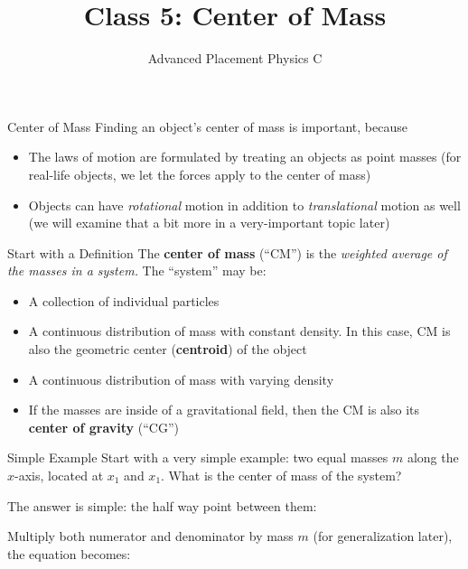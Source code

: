 \documentclass[12pt,compress,aspectratio=169]{beamer}
\title{Class 5: Center of Mass}
\subtitle{Advanced Placement Physics C}
\begin{document}
\begin{frame}
  \maketitle
\end{frame}



\begin{frame}{Center of Mass}
  Finding an object's center of mass is important, because
  \begin{itemize}
  \item The laws of motion are formulated by treating an objects as point
    masses (for real-life objects, we let the forces apply to the center of
    mass)
  \item Objects can have \emph{rotational} motion in addition to
    \emph{translational} motion as well (we will examine that a bit more in a
    very-important topic later)
  \end{itemize}
\end{frame}



\begin{frame}{Start with a Definition}
  The \textbf{center of mass} (``CM'') is the \emph{weighted average of the
  masses in a system.} The ``system'' may be:
  \begin{itemize}
  \item A collection of individual particles
  \item A continuous distribution of mass with constant density. In this case,
    CM is also the geometric center (\textbf{centroid}) of the object
  \item A continuous distribution of mass with varying density
  \item If the masses are inside of a gravitational field, then the CM is also
    its \textbf{center of gravity} (``CG'')
  \end{itemize}
\end{frame}



\begin{frame}{Simple Example}
  Start with a very simple example: two equal masses $m$ along the $x$-axis,
  located at $x_1$ and $x_1$. What is the center of mass of the system?
  \begin{center}
  \end{center}
  The answer is simple: the half way point between them:


  Multiply both numerator and denominator by mass $m$ (for generalization
  later), the equation becomes:

\end{frame}
\end{document}
